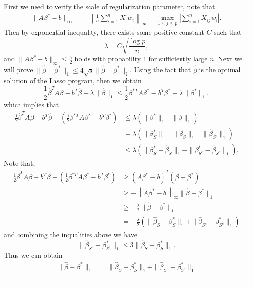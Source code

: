 \documentclass[12pt]{article}
\numberwithin{equation}{section}
\newenvironment{proof}{{\bf Proof:}}{\hfill\rule{2mm}{2mm}}
\begin{document}
\begin{proof}
	First we need to verify the scale of regularization parameter, note that
	\begin{align*}
	\|A\beta^{*}-b\|_{\infty}&=\left\|\frac{1}{n}\sum_{i=1}^{n}X_iw_i\right\|_{\infty}=\max_{1\leq j\leq p}\left|\sum_{i=1}^{n}X_{ij}w_i\right|.
	\end{align*}
	Then by exponential inequality, there exists some positive constant $C$ such that
	$$
	\lambda= C\sqrt{\frac{\log p}{n}},
	$$
	and $\|A\beta^{*}-b\|_{\infty}\leq \frac{\lambda}{2}$ holds with probability 1 for sufficiently large $n$. Next we will prove $\|\hat{\beta}-\beta^{*}\|_1\leq 4\sqrt{s}\|\hat{\beta}-\beta^{*}\|_2$. Using the fact that $\hat{\beta}$ is the optimal solution of the Lasso program, then we obtain
	\begin{equation}
	\frac{1}{2}\hat\beta^TA\beta-b^T\hat\beta+\lambda\|\hat\beta\|_1\leq \frac{1}{2}\beta^{*T}A\beta^{*}-b^T\beta^{*}+\lambda\|\beta^{*}\|_1,
	\end{equation}
	which implies that 
	\begin{align*}
	\frac{1}{2}\hat\beta^TA\beta-b^T\hat\beta-\left(\frac{1}{2}\beta^{*T}A\beta^{*}-b^T\beta^{*}\right)&\leq \lambda\left(\|\beta^{*}\|_1-\|\hat\beta\|_1\right)\\
	&=\lambda\left(\|\beta^{*}_S\|_1-\|\hat\beta_S\|_1-\|\hat\beta_{S^c}\|_1\right)\\
	&\leq \lambda\left(\|\beta^{*}_S-\hat\beta_S\|_1-\|\beta^{*}_{S^c}-\hat\beta_{S^c}\|_1\right).
	\end{align*}
	Note that,
	\begin{align*}
	\frac{1}{2}\hat\beta^TA\beta-b^T\hat\beta-\left(\frac{1}{2}\beta^{*T}A\beta^{*}-b^T\beta^{*}\right)&\geq (A\beta^{*}-b)^T(\hat{\beta}-\beta^{*})\\
	&\geq -\left\|A\beta^{*}-b\right\|_{\infty}\|\hat{\beta}-\beta^{*}\|_1\\
	&\geq -\frac{\lambda}{2}\|\hat{\beta}-\beta^{*}\|_1\\
	&=-\frac{\lambda}{2}\left(\|\hat{\beta}_S-\beta^{*}_S\|_1+\|\hat{\beta}_{S^c}-\beta^{*}_{S^c}\|_1\right)
	\end{align*}
	and combining the inqualities above we have
	\begin{equation}
	\|\hat{\beta}_{S^c}-\beta^{*}_{S^c}\|_1\leq 3 \|\hat{\beta}_S-\beta^{*}_S\|_1.
	\end{equation}
	Thus we can obtain
	\begin{align*}
	\|\hat{\beta}-\beta^{*}\|_1&=\|\hat{\beta}_{S}-\beta^{*}_{S}\|_1+\|\hat{\beta}_{S^c}-\beta^{*}_{S^c}\|_1\\

\end{align*}
\end{proof}
\end{document}
